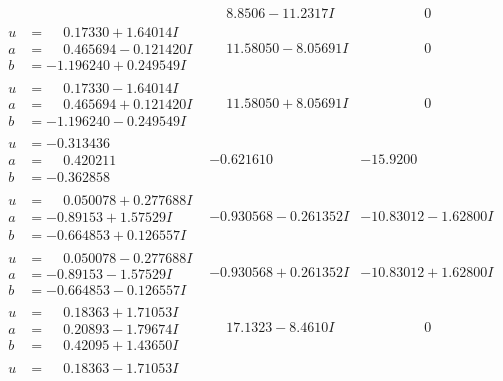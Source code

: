\documentclass[1p]{elsarticle_modified}
\theoremstyle{definition}
\begin{document}
$$\begin{array}{c|c|c}
 & \phantom{-}8.8506 - 11.2317 I & \phantom{-0.000000 } 0 \\ \hline\begin{aligned}
u &= \phantom{-}0.17330 + 1.64014 I \\
a &= \phantom{-}0.465694 - 0.121420 I \\
b &= -1.196240 + 0.249549 I\end{aligned}
 & \phantom{-}11.58050 - 8.05691 I & \phantom{-0.000000 } 0 \\ \hline\begin{aligned}
u &= \phantom{-}0.17330 - 1.64014 I \\
a &= \phantom{-}0.465694 + 0.121420 I \\
b &= -1.196240 - 0.249549 I\end{aligned}
 & \phantom{-}11.58050 + 8.05691 I & \phantom{-0.000000 } 0 \\ \hline\begin{aligned}
u &= -0.313436\phantom{ +0.000000I} \\
a &= \phantom{-}0.420211\phantom{ +0.000000I} \\
b &= -0.362858\phantom{ +0.000000I}\end{aligned}
 & -0.621610\phantom{ +0.000000I} & -15.9200\phantom{ +0.000000I} \\ \hline\begin{aligned}
u &= \phantom{-}0.050078 + 0.277688 I \\
a &= -0.89153 + 1.57529 I \\
b &= -0.664853 + 0.126557 I\end{aligned}
 & -0.930568 - 0.261352 I & -10.83012 - 1.62800 I \\ \hline\begin{aligned}
u &= \phantom{-}0.050078 - 0.277688 I \\
a &= -0.89153 - 1.57529 I \\
b &= -0.664853 - 0.126557 I\end{aligned}
 & -0.930568 + 0.261352 I & -10.83012 + 1.62800 I \\ \hline\begin{aligned}
u &= \phantom{-}0.18363 + 1.71053 I \\
a &= \phantom{-}0.20893 - 1.79674 I \\
b &= \phantom{-}0.42095 + 1.43650 I\end{aligned}
 & \phantom{-}17.1323 - 8.4610 I & \phantom{-0.000000 } 0 \\ \hline\begin{aligned}
u &= \phantom{-}0.18363 - 1.71053 I \\

\end{aligned}
\end{array}$$
\end{document}
